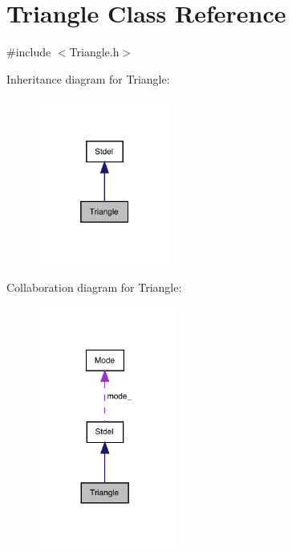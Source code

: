 \hypertarget{classTriangle}{}\section{Triangle Class Reference}
\label{classTriangle}


{\ttfamily \#include $<$Triangle.\+h$>$}



Inheritance diagram for Triangle\+:
\nopagebreak
\begin{figure}[H]
\begin{center}
\leavevmode
\includegraphics[width=124pt]{classTriangle__inherit__graph}
\end{center}
\end{figure}


Collaboration diagram for Triangle\+:
\nopagebreak
\begin{figure}[H]
\begin{center}
\leavevmode
\includegraphics[width=128pt]{classTriangle__coll__graph}
\end{center}
\end{figure}
